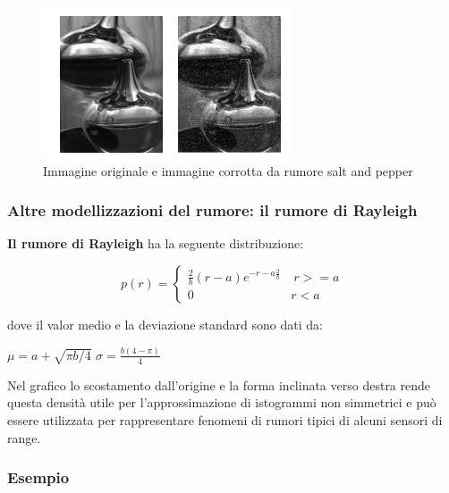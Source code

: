 \begin{figure}[H]
    \centering
    \includegraphics[width=\linewidth, keepaspectratio]{capitoli/immagini/imgs/esempio-salt-pepper.png}
    \caption*{Immagine originale e immagine corrotta da rumore salt and pepper}
\end{figure}

\subsubsection{Altre modellizzazioni del rumore: il rumore di Rayleigh}
\textbf{Il rumore di Rayleigh} ha la seguente distribuzione:


\begin{center}
    $$
        p(r) = \left\{ \begin{array}{cl}
            \frac{2}{b}(r-a)e^{-{r-a}\frac{2}{b}} & \ r >= a \\
            0                                     & r<a
        \end{array} \right.
    $$
\end{center}

dove il valor medio e la deviazione standard sono dati da:

\begin{center}
    $\mu = a + \sqrt{\pi b/4}$ $\sigma = \frac{b(4-\pi)}{4}$
\end{center}

Nel grafico lo scostamento dall'origine e la forma inclinata verso
destra rende questa densità utile per l'approssimazione di
istogrammi non simmetrici e può essere utilizzata per rappresentare
fenomeni di rumori tipici di alcuni sensori di range.

\subsubsection{Esempio}


